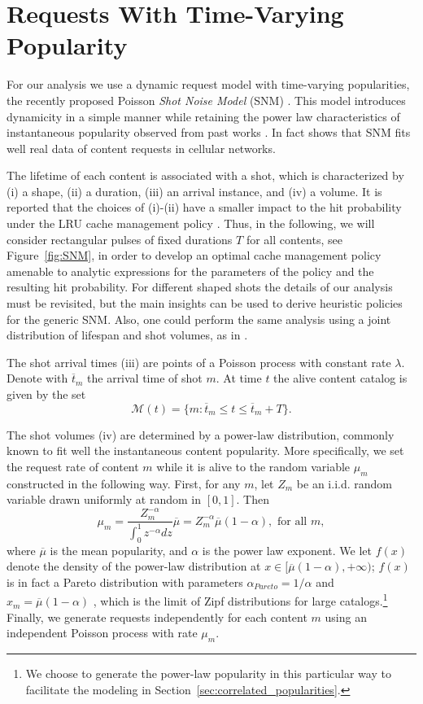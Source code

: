 \documentclass[10pt, conference, letterpaper]{IEEEtran}
\newcommand{\spyros}[1]{{#1}}
\begin{document}
\section{Requests With Time-Varying Popularity}\label{sec:snm}

For our analysis we use a dynamic request model with time-varying popularities, the recently proposed Poisson \emph{Shot Noise Model} (SNM) \cite{traverso2015}.
This model introduces dynamicity in a simple manner while retaining the power law characteristics of instantaneous popularity observed from past works \cite{breslau99,adamic02,newman05}. In fact \cite{traverso2015} shows that SNM fits well real  data \spyros {of content requests in cellular networks}.

The lifetime of each content is associated with a shot, which is characterized by (i) a shape, (ii) a duration, (iii) an arrival instance, and (iv) a volume.
It is reported that the choices of (i)-(ii) have a smaller impact to the hit probability under the LRU cache management policy \cite{traverso2015}. Thus, in the following, we will consider rectangular pulses of fixed durations $T$ for all contents, see Figure~\ref{fig:SNM}, in order to develop an optimal cache management policy amenable to analytic expressions for the parameters of the policy and the resulting hit probability. For different shaped shots the details of our analysis must be revisited, but the main insights can be used to derive heuristic policies for the generic SNM. Also, one could perform the same analysis using a joint distribution of lifespan and shot volumes, as in \cite{olmos2014catalog}. 


The shot arrival times (iii) are points of a Poisson  process with constant rate $\lambda$. 
Denote with $\overline t_m$ the arrival time of shot $m$.
At time $t$ the alive content catalog is given by the set
\[
\mathcal{M}(t)=\{m: \overline t_m\leq t\leq \overline t_m+T\}.
\]

The shot volumes (iv) are determined by a power-law distribution, commonly known to fit well the instantaneous content popularity.
More specifically, we set the request rate of content $m$ while it is alive to the random variable $\mu_m$ constructed in the following way. First, for any $m$, let $Z_m$ be an i.i.d. random variable drawn uniformly at random in $[0,1]$. Then
\[
\mu_m=\frac{Z_m^{-\alpha}}{\int_0^1z^{-\alpha}dz}\overline{\mu}=Z_m^{-\alpha}\overline{\mu}(1-\alpha), \text{ for all }m,
\]
where $\overline \mu$ is the mean popularity, and $\alpha$ is the power law exponent. 
{We let $f(x)$ denote the density of the power-law distribution at $x\in[\overline \mu(1-\alpha),+\infty)$; $f(x)$ is in fact a Pareto distribution \spyros {with parameters $\alpha_{Pareto} = 1/\alpha$ and $x_m = \overline{\mu}(1-\alpha)$} \cite{newman05}, which is the limit of Zipf distributions for large catalogs.\footnote{We choose to generate the power-law popularity in this particular way to facilitate the modeling in Section~\ref{sec:correlated_popularities}.}}
 Finally, we generate requests independently for each content $m$ using an independent Poisson process with rate $\mu_m$.
\end{document}
